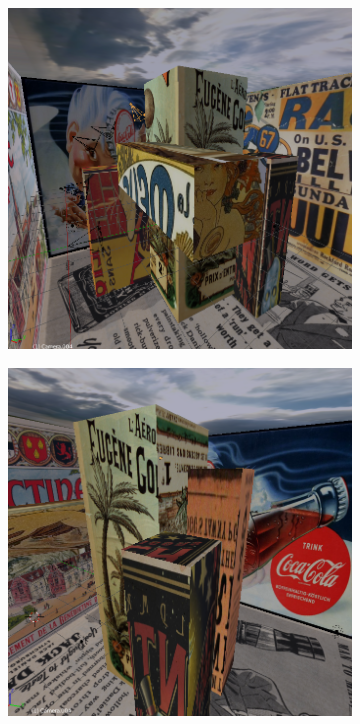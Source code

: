 \begin{figure}
\centering
	\begin{subfigure}{0.4\textwidth}
		\centering
		\includegraphics[width=\textwidth]{img/test6_1}
	\end{subfigure}
	\begin{subfigure}{0.4\textwidth}
		\centering
		\includegraphics[width=\textwidth]{img/test6_2}

\end{subfigure}
\end{figure}

